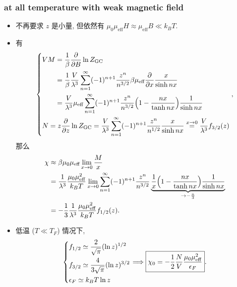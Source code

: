 \subsubsection{at all temperature with weak magnetic field}
\begin{itemize}
	\item 不再要求 $z$ 是小量, 但依然有 $\mu_0 \mu_\text{eff} H \approx \mu_\text{eff} B \ll k_B T$.
	
	\item 有
	\begin{equation}
		\begin{dcases}
			\begin{aligned}
				V M &= \frac{1}{\beta} \frac{\partial}{\partial B} \ln Z_\text{GC} \\
				&= \frac{1}{\beta} \frac{V}{\lambda^3} \sum_{n = 1}^\infty (- 1)^{n + 1} \frac{z^n}{n^{3 / 2}} \beta \mu_\text{eff} \frac{\partial}{\partial x} \frac{x}{\sinh n x} \\
				&= \frac{V}{\lambda^3} \mu_\text{eff} \sum_{n = 1}^\infty (- 1)^{n + 1} \frac{z^n}{n^{3 / 2}} \Big( 1 - \frac{n x}{\tanh n x} \Big) \frac{1}{\sinh n x}
			\end{aligned} \\
			N = z \frac{\partial}{\partial z} \ln Z_\text{GC} = \frac{V}{\lambda^3} \sum_{n = 1}^\infty (- 1)^{n + 1} \frac{z^n}{n^{1 / 2}} \frac{x}{\sinh n x} \overset{x \rightarrow 0}{=} \frac{V}{\lambda^3} f_{3 / 2}(z)
		\end{dcases},
	\end{equation}
	那么
	\begin{align}
		\chi &\approx \beta \mu_0 \mu_\text{eff} \lim_{x \rightarrow 0} \frac{M}{x} \notag \\
		&= \frac{1}{\lambda^3} \frac{\mu_0 \mu_\text{eff}^2}{k_B T} \lim_{x \rightarrow 0} \sum_{n = 1}^\infty (- 1)^{n + 1} \frac{z^n}{n^{3 / 2}} \underbrace{\frac{1}{x} \Big( 1 - \frac{n x}{\tanh n x} \Big) \frac{1}{\sinh n x}}_{\rightarrow - \frac{n}{3}} \notag \\
		&= - \frac{1}{3} \frac{1}{\lambda^3} \frac{\mu_0 \mu_\text{eff}^2}{k_B T} f_{1 / 2}(z).
	\end{align}
	
	\item 低温 ($T \ll T_F$) 情况下,
	\begin{equation}
		\begin{dcases}
			f_{1 / 2} \simeq \frac{2}{\sqrt{\pi}} (\ln z)^{1 / 2} \\
			f_{3 / 2} \simeq \frac{4}{3 \sqrt{\pi}} (\ln z)^{3 / 2} \\
			\epsilon_F \simeq k_B T \ln z
		\end{dcases} \Longrightarrow \boxed{\chi_0 = - \frac{1}{2} \frac{N}{V} \frac{\mu_0 \mu_\text{eff}^2}{\epsilon_F}}.
	\end{equation}
\end{itemize}

